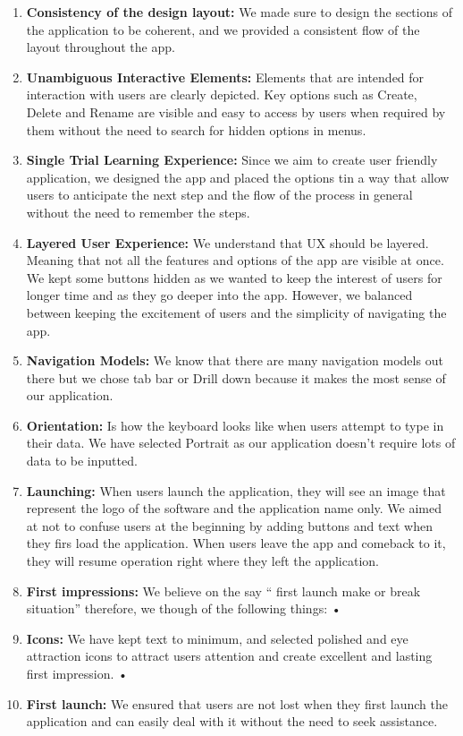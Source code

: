 \documentclass{article}
\begin{document}
\begin{enumerate}
\item \textbf{Consistency of the design layout:} We made sure to design the sections of the application to be coherent, and we provided a consistent flow of the layout throughout the app.
\item \textbf{Unambiguous Interactive Elements:} Elements that are intended for interaction with users are clearly depicted. Key options such as Create, Delete and Rename are visible and easy to access by users when required by them without the need to search for hidden options in menus.
\item \textbf{Single Trial Learning Experience:}  Since we aim to create user friendly application, we designed the app and placed the options tin a way that allow users to anticipate the next step and the flow of the process in general without the need to remember the steps.
\item \textbf{Layered User Experience:} We understand that UX should be layered. Meaning that not all the features and options of the app are visible at once. We kept some buttons hidden as we wanted to keep the interest of users for longer time and as they go deeper into the app. However, we balanced between keeping the excitement of users and the simplicity of navigating the app.
\item \textbf{Navigation Models:} We know that there are many navigation models out there but we chose tab bar or Drill down because it makes the most sense of our application.
\item \textbf{Orientation:} Is how the keyboard looks like when users attempt to type in their data. We have selected Portrait as our application doesn’t require lots of data to be inputted.
\item \textbf{Launching:} When users launch the application, they will see an image that represent the logo of the software and the application name only. We aimed at not to confuse users at the beginning by adding buttons and text when they firs load the application. When users leave the app and comeback to it, they will resume operation right where they left the application.
\item \textbf{First impressions:} We believe on the say “ first launch make or break situation” therefore, we though of the following things:
•	\item \textbf{Icons:} We have kept text to minimum, and selected polished and eye attraction icons to attract users attention and create excellent and lasting first impression.
•	\item \textbf{First launch:} We ensured that users are not lost when they first launch the application and can easily deal with it without the need to seek assistance.
\end{enumerate}
\end{document}
